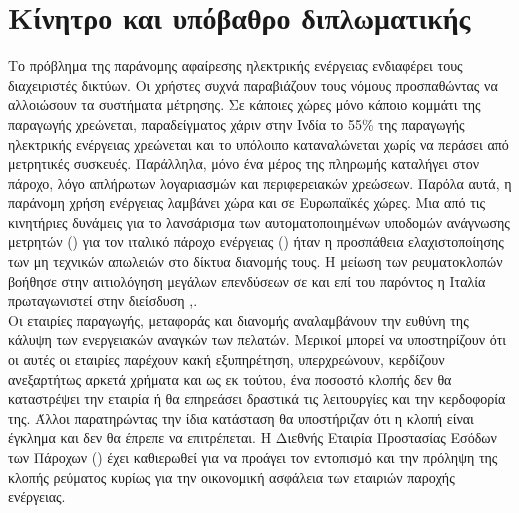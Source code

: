 \section{Κίνητρο και υπόβαθρο διπλωματικής}
Το πρόβλημα της παράνομης αφαίρεσης ηλεκτρικής ενέργειας ενδιαφέρει τους διαχειριστές δικτύων. Οι χρήστες συχνά παραβιάζουν τους νόμους προσπαθώντας να αλλοιώσουν τα συστήματα μέτρησης. Σε κάποιες χώρες μόνο κάποιο κομμάτι της παραγωγής χρεώνεται, παραδείγματος χάριν στην Ινδία το 55\% της παραγωγής ηλεκτρικής ενέργειας χρεώνεται και το υπόλοιπο καταναλώνεται χωρίς να περάσει από μετρητικές συσκευές. Παράλληλα, μόνο ένα μέρος της πληρωμής καταλήγει στον πάροχο, λόγο απλήρωτων λογαριασμών και περιφερειακών χρεώσεων. Παρόλα αυτά, η παράνομη χρήση ενέργειας λαμβάνει χώρα και σε Ευρωπαϊκές χώρες. Μια από τις κινητήριες δυνάμεις για το λανσάρισμα των αυτοματοποιημένων υποδομών ανάγνωσης μετρητών () για τον ιταλικό πάροχο ενέργειας () ήταν η προσπάθεια ελαχιστοποίησης των μη τεχνικών απωλειών στο δίκτυα διανομής τους. Η μείωση των ρευματοκλοπών βοήθησε στην αιτιολόγηση μεγάλων επενδύσεων σε  και επί του παρόντος η Ιταλία πρωταγωνιστεί στην διείσδυση  \cite{india},\cite{regulation}.\\ 
Οι εταιρίες παραγωγής, μεταφοράς και διανομής αναλαμβάνουν την ευθύνη της κάλυψη των ενεργειακών αναγκών των πελατών. Μερικοί μπορεί να υποστηρίζουν ότι οι αυτές οι εταιρίες παρέχουν κακή εξυπηρέτηση, υπερχρεώνουν, κερδίζουν ανεξαρτήτως αρκετά χρήματα και ως εκ τούτου, ένα ποσοστό κλοπής δεν θα καταστρέψει την εταιρία ή θα επηρεάσει δραστικά τις λειτουργίες και την κερδοφορία της. Άλλοι παρατηρώντας την ίδια κατάσταση θα υποστήριζαν ότι η κλοπή είναι έγκλημα και δεν θα έπρεπε να επιτρέπεται. Η Διεθνής Εταιρία Προστασίας Εσόδων των Πάροχων () έχει καθιερωθεί για να προάγει τον εντοπισμό και την πρόληψη της κλοπής ρεύματος κυρίως για την οικονομική ασφάλεια των εταιριών παροχής ενέργειας.\par
